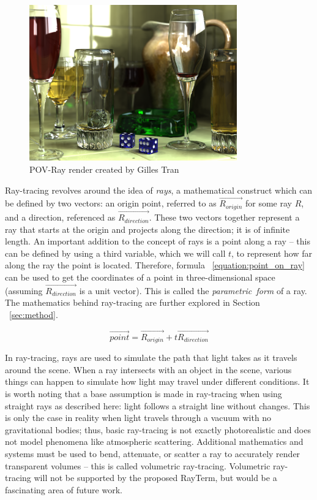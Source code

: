 \documentclass[11pt]{article}
\newcommand{\name}{{\sc RayTerm}}
\newcommand{\rayorg}{\vec{R_{origin}}}
\newcommand{\raydir}{\vec{R_{direction}}}
\begin{document}
\begin{figure}[htb]
  \centering
  \includegraphics[width=0.8\textwidth]{resources/glasses_povray}
  \caption{POV-Ray render created by Gilles Tran \cite{povray2006render}}
  \label{fig:povray_render}
\end{figure}


Ray-tracing revolves around the idea of {\it rays}, a mathematical construct which can be defined by two vectors: an origin point, referred to as $\rayorg$ for some ray $R$, and a direction, referenced as $\raydir$.
These two vectors together represent a ray that starts at the origin and projects along the direction; it is of infinite length.
An important addition to the concept of rays is a point along a ray -- this can be defined by using a third variable, which we will call $t$, to represent how far along the ray the point is located.
Therefore, formula ~\ref{equation:point_on_ray} can be used to get the coordinates of a point in three-dimensional space (assuming $\raydir$ is a unit vector).
This is called the {\it parametric~form} of a ray.
The mathematics behind ray-tracing are further explored in Section ~\ref{sec:method}.

\begin{equation}
  \label{equation:point_on_ray}
  \vec{point} = \rayorg + t\raydir
\end{equation}

In ray-tracing, rays are used to simulate the path that light takes as it travels around the scene.
When a ray intersects with an object in the scene, various things can happen to simulate how light may travel under different conditions.
It is worth noting that a base assumption is made in ray-tracing when using straight rays as described here: light follows a straight line without changes.
This is only the case in reality when light travels through a vacuum with no gravitational bodies; thus, basic ray-tracing is not exactly photorealistic and does not model phenomena like atmospheric scattering.
Additional mathematics and systems must be used to bend, attenuate, or scatter a ray to accurately render transparent volumes -- this is called volumetric ray-tracing.
Volumetric ray-tracing will not be supported by the proposed \name, but would be a fascinating area of future work.
\end{document}
